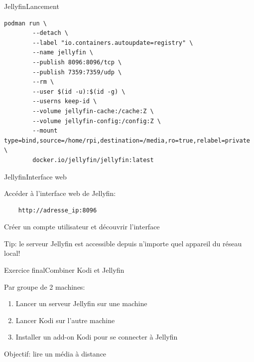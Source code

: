 \documentclass[
aspectratio=169 %
]{beamer}
\begin{document}
\begin{frame}[fragile]{Jellyfin}{Lancement}

    \begin{lstlisting}[language={}]
    podman run \
        --detach \
        --label "io.containers.autoupdate=registry" \
        --name jellyfin \
        --publish 8096:8096/tcp \
        --publish 7359:7359/udp \
        --rm \
        --user $(id -u):$(id -g) \
        --userns keep-id \
        --volume jellyfin-cache:/cache:Z \
        --volume jellyfin-config:/config:Z \
        --mount type=bind,source=/home/rpi,destination=/media,ro=true,relabel=private \
        docker.io/jellyfin/jellyfin:latest
    \end{lstlisting}
\end{frame}

\begin{frame}[fragile]{Jellyfin}{Interface web}

    Accéder à l'interface web de Jellyfin:

    \begin{verbatim}
    http://adresse_ip:8096
    \end{verbatim}

    \bigskip
    Créer un compte utilisateur et découvrir l'interface

    \bigskip
    \alert{Tip:} le serveur Jellyfin est accessible depuis n'importe quel
    appareil du réseau local!

\end{frame}

\begin{frame}{Exercice final}{Combiner Kodi et Jellyfin}

    Par groupe de 2 machines:
    \begin{enumerate}
        \item Lancer un serveur Jellyfin sur une machine
        \item Lancer Kodi sur l'autre machine
        \item Installer un add-on Kodi pour se connecter à Jellyfin
    \end{enumerate}

    \bigskip
    Objectif: lire un média à distance

\end{frame}
\end{document}
